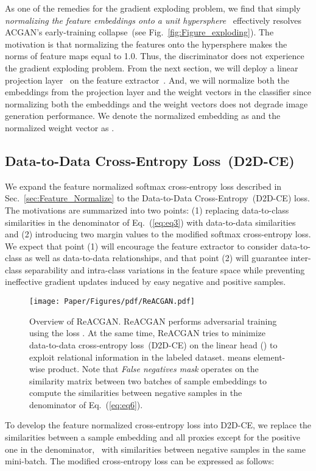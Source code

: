 \documentclass{article}
\begin{document}
As one of the remedies for the gradient exploding problem, we find that simply \emph{normalizing the feature embeddings onto a unit hypersphere}~ effectively resolves ACGAN's early-training collapse~(see Fig.~\ref{fig:Figure_exploding}). The motivation is that normalizing the features onto the hypersphere makes the norms of feature maps equal to 1.0. Thus, the discriminator does not experience the gradient exploding problem. From the next section, we will deploy a linear projection layer~ on the feature extractor~. And, we will normalize both the embeddings from the projection layer and the weight vectors  in the classifier since normalizing both the embeddings and the weight vectors does not degrade image generation performance. We denote the normalized embedding  as  and the normalized weight vector  as .

\subsection{Data-to-Data Cross-Entropy Loss~(D2D-CE)}
\label{sec:Dada_Softmax}
We expand the feature normalized softmax cross-entropy loss described in Sec.~\ref{sec:Feature_Normalize} to the Data-to-Data Cross-Entropy~(D2D-CE) loss. The motivations are summarized into two points: (1) replacing data-to-class similarities in the denominator of Eq.~(\ref{eq:eq3}) with data-to-data similarities and (2) introducing two margin values to the modified softmax cross-entropy loss. We expect that point (1) will encourage the feature extractor to consider data-to-class as well as data-to-data relationships, and that point (2) will guarantee inter-class separability and intra-class variations in the feature space while preventing ineffective gradient updates induced by easy negative and positive samples.
\begin{figure}[t!]
    \centering
    \texttt{[image: Paper/Figures/pdf/ReACGAN.pdf]}
    \caption{Overview of ReACGAN. ReACGAN performs adversarial training using the loss . At the same time, ReACGAN tries to minimize data-to-data cross-entropy loss~(D2D-CE) on the linear head () to exploit relational information in the labeled dataset.  means element-wise product. Note that \emph{False negatives mask} operates on the similarity matrix between two batches of sample embeddings to compute the similarities between negative samples in the denominator of Eq.~(\ref{eq:eq6}).}
    \label{fig:Figure_ReACGAN}
\end{figure} To develop the feature normalized cross-entropy loss into D2D-CE, we replace the similarities between a sample embedding and all proxies except for the positive one in the denominator,~ with similarities between negative samples in the same mini-batch. The modified cross-entropy loss can be expressed as follows:
\end{document}
